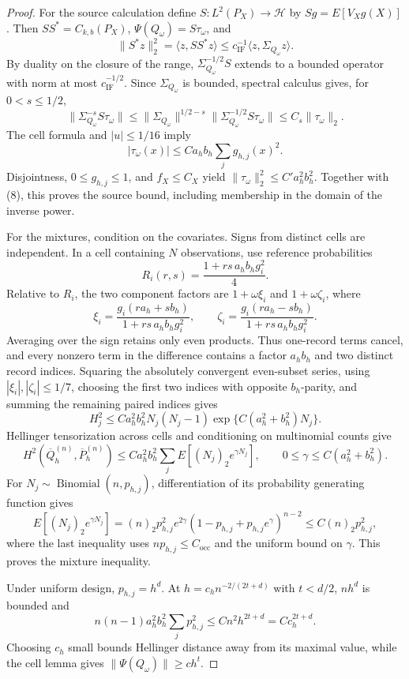 \documentclass{article}
\begin{document}
\begin{proof}
For the source calculation define \(S:L^2(P_X)\to\mathcal H\) by \(Sg=E[V_Xg(X)]\). Then \(SS^*=C_{k,b}(P_X)\), \(\Psi(Q_\omega)=S\tau_\omega\), and
\[
\|S^*z\|_2^2=\langle z,SS^*z\rangle
\le c_{\mathrm{IF}}^{-1}\langle z,\Sigma_{Q_\omega}z\rangle.
\]
By duality on the closure of the range, \(\Sigma_{Q_\omega}^{-1/2}S\) extends to a bounded operator with norm at most \(c_{\mathrm{IF}}^{-1/2}\). Since \(\Sigma_{Q_\omega}\) is bounded, spectral calculus gives, for \(0<s\le1/2\),
\[
\|\Sigma_{Q_\omega}^{-s}S\tau_\omega\|
\le\|\Sigma_{Q_\omega}\|^{1/2-s}
 \|\Sigma_{Q_\omega}^{-1/2}S\tau_\omega\|
\le C_s\|\tau_\omega\|_2. \tag{8}
\]
The cell formula and \(|u|\le1/16\) imply
\[
|\tau_\omega(x)|\le Ca_hb_h\sum_jg_{h,j}(x)^2.
\]
Disjointness, \(0\le g_{h,j}\le1\), and \(f_X\le C_X\) yield \(\|\tau_\omega\|_2^2\le C'a_h^2b_h^2\). Together with (8), this proves the source bound, including membership in the domain of the inverse power.

For the mixtures, condition on the covariates. Signs from distinct cells are independent. In a cell containing \(N\) observations, use reference probabilities
\[
R_i(r,s)=\frac{1+rs\,a_hb_hg_i^2}{4}.
\]
Relative to \(R_i\), the two component factors are \(1+\omega\xi_i\) and \(1+\omega\zeta_i\), where
\[
\xi_i=\frac{g_i(ra_h+sb_h)}{1+rs\,a_hb_hg_i^2},\qquad
\zeta_i=\frac{g_i(ra_h-sb_h)}{1+rs\,a_hb_hg_i^2}.
\]
Averaging over the sign retains only even products. Thus one-record terms cancel, and every nonzero term in the difference contains a factor \(a_hb_h\) and two distinct record indices. Squaring the absolutely convergent even-subset series, using \(|\xi_i|,|\zeta_i|\le1/7\), choosing the first two indices with opposite \(b_h\)-parity, and summing the remaining paired indices gives
\[
H_j^2\le Ca_h^2b_h^2N_j(N_j-1)
\exp\{C(a_h^2+b_h^2)N_j\}. \tag{9}
\]
Hellinger tensorization across cells and conditioning on multinomial counts give
\[
H^2(\overline Q_h^{(n)},\overline P_h^{(n)})
\le Ca_h^2b_h^2\sum_jE[(N_j)_2e^{\gamma N_j}],
\qquad 0\le\gamma\le C(a_h^2+b_h^2).
\]
For \(N_j\sim\operatorname{Binomial}(n,p_{h,j})\), differentiation of its probability generating function gives
\[
E[(N_j)_2e^{\gamma N_j}]
=(n)_2p_{h,j}^2e^{2\gamma}
(1-p_{h,j}+p_{h,j}e^\gamma)^{n-2}
\le C(n)_2p_{h,j}^2,
\]
where the last inequality uses \(np_{h,j}\le C_{\mathrm{occ}}\) and the uniform bound on \(\gamma\). This proves the mixture inequality.

Under uniform design, \(p_{h,j}=h^d\). At \(h=c_hn^{-2/(2t+d)}\) with \(t<d/2\), \(nh^d\) is bounded and
\[
n(n-1)a_h^2b_h^2\sum_jp_{h,j}^2
\le Cn^2h^{2t+d}=Cc_h^{2t+d}.
\]
Choosing \(c_h\) small bounds Hellinger distance away from its maximal value, while the cell lemma gives \(\|\Psi(Q_\omega)\|\ge ch^t\).
\end{proof}
\end{document}
